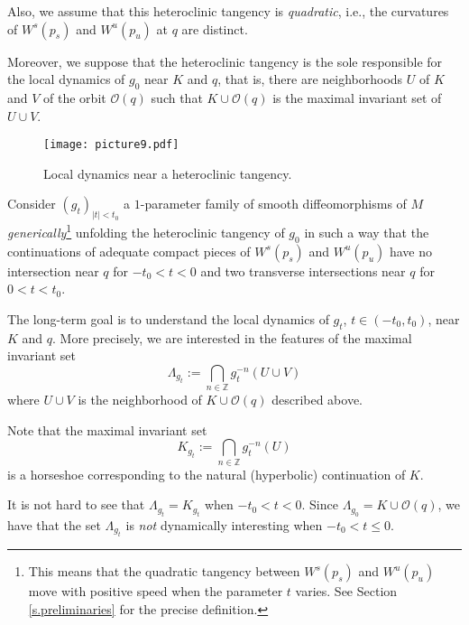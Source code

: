 \documentclass[12pt]{amsart}
\numberwithin{equation}{section}
\theoremstyle{definition}
\newcommand{\<}{{\langle}}
\renewcommand{\>}{{\rangle}}
\begin{document}
Also, we assume that this heteroclinic tangency is \emph{quadratic}, i.e., the curvatures of $W^s(p_s)$ and $W^u(p_u)$ at $q$ are distinct. 

Moreover, we suppose that the heteroclinic tangency is the sole responsible for the local dynamics of $g_0$ near $K$ and $q$, that is, 
there are neighborhoods $U$ of $K$ and $V$ of the orbit $\mathcal{O}(q)$ such that $K\cup\mathcal{O}(q)$ is the maximal invariant set of $U\cup V$.  

\begin{figure}[htb!]
\texttt{[image: picture9.pdf]}
\caption{Local dynamics near a heteroclinic tangency.}\label{f.heteroclinic-tangency}
\end{figure}

Consider $(g_t)_{|t|<t_0}$ a $1$-parameter family of smooth diffeomorphisms of $M$ \emph{generically}\footnote{%
This means that the quadratic tangency between $W^s(p_s)$ and $W^u(p_u)$ move with positive speed when the parameter $t$ varies. See Section \ref{s.preliminaries} for the precise definition.} unfolding the heteroclinic tangency of $g_0$ in such a way that the continuations of adequate compact pieces of $W^s(p_s)$ and $W^u(p_u)$ have no intersection near $q$ for $-t_0<t<0$ and two transverse intersections near $q$ for $0<t<t_0$. 

The long-term goal is to understand the local dynamics of $g_t$, $t\in (-t_0, t_0)$, near $K$ and $q$. More precisely, we are interested in the features of the maximal invariant set 
\begin{equation}\label{e.Lambda-gt}
\Lambda_{g_t}:= \bigcap\limits_{n\in\mathbb{Z}} g_t^{-n}(U\cup V)
\end{equation}
where $U\cup V$ is the neighborhood of $K\cup\mathcal{O}(q)$ described above.  

Note that the maximal invariant set 
\begin{equation}\label{e.K-gt}
K_{g_t}:=\bigcap\limits_{n\in\mathbb{Z}} g_t^{-n}(U)
\end{equation}
is a horseshoe corresponding to the natural (hyperbolic) continuation of $K$.

It is not hard to see that $\Lambda_{g_t} = K_{g_t}$ when $-t_0<t<0$. Since $\Lambda_{g_0}=K\cup\mathcal{O}(q)$, we have that the set $\Lambda_{g_t}$ is \emph{not} dynamically interesting when $-t_0<t\leq 0$. 
\end{document}
